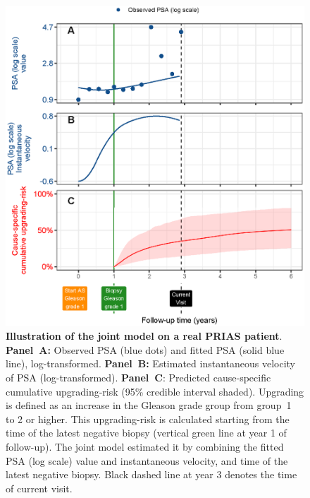 \begin{figure}
\centerline{\includegraphics[width=\columnwidth]{images/jmExplanationPlot_113.eps}}
\caption{\textbf{Illustration of the joint model on a real PRIAS patient}. \textbf{Panel~A:} Observed PSA (blue dots) and fitted PSA (solid blue line), log-transformed. \textbf{Panel~B:} Estimated instantaneous velocity of PSA (log-transformed). \textbf{Panel~C}: Predicted cause-specific cumulative upgrading-risk (95\% credible interval shaded). Upgrading is defined as an increase in the Gleason grade group from group~1~\citep{epsteinGG2014} to 2 or higher. This upgrading-risk is calculated starting from the time of the latest negative biopsy (vertical green line at year 1 of follow-up). The joint model estimated it by combining the fitted PSA (log scale) value and instantaneous velocity, and time of the latest negative biopsy. Black dashed line at year 3 denotes the time of current visit.}
\label{fig:jmExplanationPlot_113}
\end{figure}

